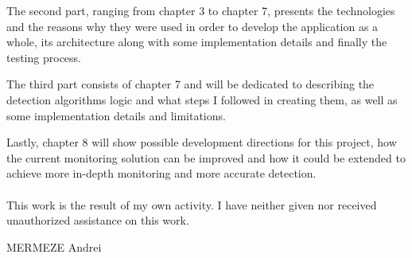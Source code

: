 \documentclass[a4paper]{article}
\begin{document}
    The second part, ranging from chapter 3 to chapter 7, presents the technologies and the reasons why they were used in order to
    develop the application as a whole, its architecture along with some implementation details and finally the testing process.

    The third part consists of chapter 7 and will be dedicated to describing the detection algorithms logic and what steps I followed in
    creating them, as well as some implementation details and limitations.

    Lastly, chapter 8 will show possible development directions for this project, how the current monitoring solution can be improved and
    how it could be extended to achieve more in-depth monitoring and more accurate detection.

    \paragraph{}
    This work is the result of my own activity. I have neither given nor received unauthorized assistance on this work.

    \vfill

    \begin{flushright}
        {\normalsize MERMEZE Andrei}
    \end{flushright}

    
\end{document}
